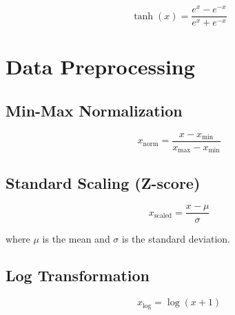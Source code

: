 \documentclass[12pt]{article}
\begin{document}
\begin{equation}
\tanh(x) = \frac{e^x - e^{-x}}{e^x + e^{-x}}
\end{equation}

\section{Data Preprocessing}

\subsection{Min-Max Normalization}

\begin{equation}
x_{\text{norm}} = \frac{x - x_{\min}}{x_{\max} - x_{\min}}
\end{equation}

\subsection{Standard Scaling (Z-score)}

\begin{equation}
x_{\text{scaled}} = \frac{x - \mu}{\sigma}
\end{equation}

where $\mu$ is the mean and $\sigma$ is the standard deviation.

\subsection{Log Transformation}

\begin{equation}
x_{\log} = \log(x + 1)
\end{equation}



\end{document}
